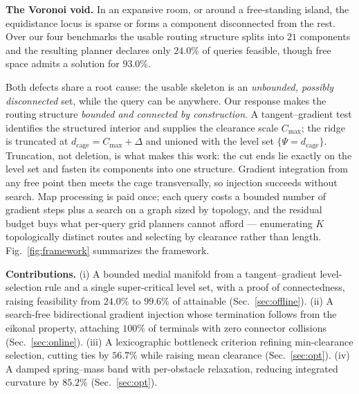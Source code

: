 \documentclass[conference]{IEEEtran}
\begin{document}
\textbf{The Voronoi void.} In an expansive room, or around a free-standing island, the equidistance locus is sparse or forms a component disconnected from the rest. Over our four benchmarks the usable routing structure splits into $21$ components and the resulting planner declares only $24.0\%$ of queries feasible, though free space admits a solution for $93.0\%$.

Both defects share a root cause: the usable skeleton is an \emph{unbounded, possibly disconnected} set, while the query can be anywhere. Our response makes the routing structure \emph{bounded and connected by construction}. A tangent--gradient test identifies the structured interior and supplies the clearance scale $C_{\max}$; the ridge is truncated at $d_{\mathrm{cage}}=C_{\max}+\Delta$ and unioned with the level set $\{\Psi=d_{\mathrm{cage}}\}$. Truncation, not deletion, is what makes this work: the cut ends lie exactly on the level set and fasten its components into one structure. Gradient integration from any free point then meets the cage transversally, so injection succeeds without search. Map processing is paid once; each query costs a bounded number of gradient steps plus a search on a graph sized by topology, and the residual budget buys what per-query grid planners cannot afford --- enumerating $K$ topologically distinct routes and selecting by clearance rather than length. Fig.~\ref{fig:framework} summarizes the framework.

\textbf{Contributions.} (i) A bounded medial manifold from a tangent--gradient level-selection rule and a single super-critical level set, with a proof of connectedness, raising feasibility from $24.0\%$ to $99.6\%$ of attainable (Sec.~\ref{sec:offline}). (ii) A search-free bidirectional gradient injection whose termination follows from the eikonal property, attaching $100\%$ of terminals with zero connector collisions (Sec.~\ref{sec:online}). (iii) A lexicographic bottleneck criterion refining min-clearance selection, cutting ties by $56.7\%$ while raising mean clearance (Sec.~\ref{sec:opt}). (iv) A damped spring--mass band with per-obstacle relaxation, reducing integrated curvature by $85.2\%$ (Sec.~\ref{sec:opt}).
\end{document}
